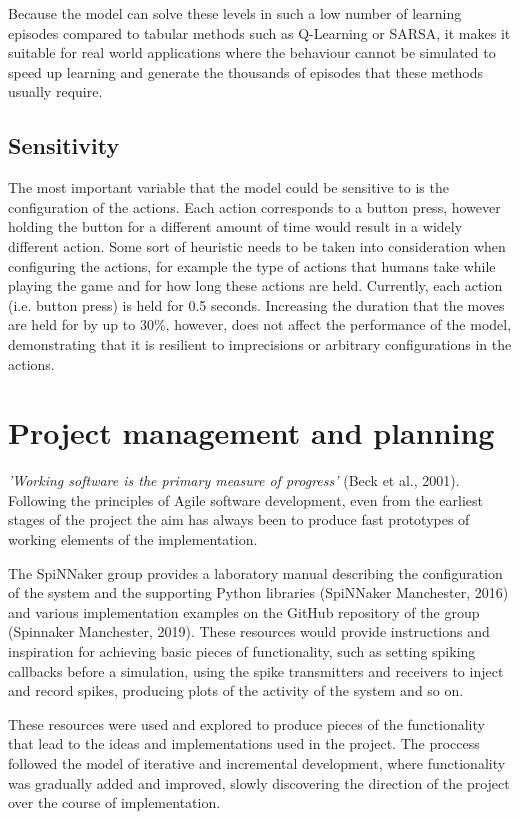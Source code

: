 \documentclass[10pt]{article}
\begin{document}
    Because the model can solve these levels in such a low number of learning episodes compared to tabular methods such as Q-Learning or SARSA, it makes it suitable for real world applications where the behaviour cannot be simulated to speed up learning and generate the thousands of episodes that these methods usually require.

    \subsection{Sensitivity}

    The most important variable that the model could be sensitive to is the configuration of the actions. Each action corresponds to a button press, however holding the button for a different amount of time would result in a widely different action. Some sort of heuristic needs to be taken into consideration when configuring the actions, for example the type of actions that humans take while playing the game and for how long these actions are held. Currently, each action (i.e. button press) is held for 0.5 seconds. Increasing the duration that the moves are held for by up to 30\%, however, does not affect the performance of the model, demonstrating that it is resilient to imprecisions or arbitrary configurations in the actions.

    \section{Project management and planning}

    \textit{'Working software is the primary measure of progress'} (Beck et al., 2001). Following the principles of Agile software development, even from the earliest stages of the project the aim has always been to produce fast prototypes of working elements of the implementation.

    The SpiNNaker group provides a laboratory manual describing the configuration of the system and the supporting Python libraries (SpiNNaker Manchester, 2016) and various implementation examples on the GitHub repository of the group (Spinnaker Manchester, 2019). These resources would provide instructions and inspiration for achieving basic pieces of functionality, such as setting spiking callbacks before a simulation, using the spike transmitters and receivers to inject and record spikes, producing plots of the activity of the system and so on.

    These resources were used and explored to produce pieces of the functionality that lead to the ideas and implementations used in the project. The proccess followed the model of iterative and incremental development, where functionality was gradually added and improved, slowly discovering the direction of the project over the course of implementation.
\end{document}
